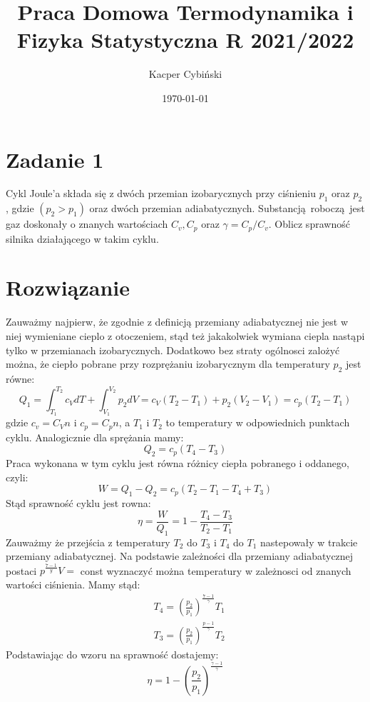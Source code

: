 \documentclass[12pt,a4paper]{article}
\title{Praca Domowa Termodynamika i Fizyka Statystyczna R 2021/2022}
\author{Kacper Cybiński}
\date{\today}
\begin{document}
\maketitle

\section{Zadanie 1}

Cykl Joule'a składa się z dwóch przemian izobarycznych przy ciśnieniu $p_1$ oraz  $p_2$, gdzie $(p_2 > p_1)$ oraz dwóch przemian adiabatycznych. Substancją roboczą jest gaz doskonały o znanych wartościach $C_v, C_p$ oraz $\gamma = C_p/C_v$. Oblicz sprawność silnika działającego w takim cyklu.
\section{Rozwiązanie}

Zauważmy najpierw, że zgodnie z definicją przemiany adiabatycznej nie jest w niej wymieniane cieplo z otoczeniem, stąd też jakakolwiek wymiana ciepla nastąpi tylko w przemianach izobarycznych. Dodatkowo bez straty ogólnosci zalożyć można, że ciepło pobrane przy rozprężaniu izobarycznym dla temperatury $p_{2}$ jest równe:
$$
Q_{1}=\int_{T_{1}}^{T_{2}} c_{V} d T+\int_{V_{1}}^{V_{2}} p_{2} d V=c_{V}\left(T_{2}-T_{1}\right)+p_{2}\left(V_{2}-V_{1}\right)=c_{p}\left(T_{2}-T_{1}\right)
$$
gdzie $c_{v}=C_{V} n$ i $c_{p}=C_{p} n$, a $T_{1}$ i $T_{2}$ to temperatury w odpowiednich punktach cyklu. Analogicznie dla sprężania mamy:
$$
Q_{2}=c_{p}\left(T_{4}-T_{3}\right)
$$
Praca wykonana w tym cyklu jest równa różnicy ciepła pobranego i oddanego, czyli:
$$
W=Q_{1}-Q_{2}=c_{p}\left(T_{2}-T_{1}-T_{4}+T_{3}\right)
$$
Stąd sprawność cyklu jest rowna:
$$
\eta=\frac{W}{Q_{1}}=1-\frac{T_{4}-T_{3}}{T_{2}-T_{1}}
$$
Zauważmy że przejścia z temperatury $T_{2}$ do $T_{3}$ i $T_{4}$ do $T_{1}$ nastepowały w trakcie przemiany adiabatycznej. Na podstawie zależności dla przemiany adiabatycznej postaci $p^{\frac{7-1}{y}} V=$ const wyznaczyć można temperatury w zależnosci od znanych wartości ciśnienia. Mamy stąd:
$$
\begin{aligned}
&T_{4}=\left(\frac{p_{2}}{p_{1}}\right)^{\frac{7-1}{\gamma}} T_{1} \\
&T_{3}=\left(\frac{p_{2}}{p_{1}}\right)^{\frac{p-1}{\gamma}} T_{2}
\end{aligned}
$$
Podstawiając do wzoru na sprawność dostajemy:
$$
\eta=1-\left(\frac{p_{2}}{p_{1}}\right)^{\frac{\gamma-1}{\gamma}}
$$
\end{document}
